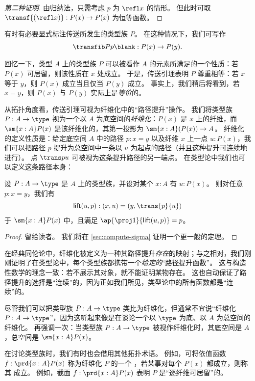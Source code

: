 \begin{proof}[第二种证明]
  由归纳法，只需考虑 $p$ 为 $\refl x$ 的情形。
  但此时可取 $\transf{(\refl x)}:P(x)\to P(x)$ 为恒等函数。
\end{proof}

有时有必要显式标注传送所发生的类型族 $P$。
在这种情况下，我们可写作
\[\transfib P p \blank : P(x) \to P(y).\]

回忆一下，类型 $A$ 上的类型族 $P$ 可以被看作 $A$ 的元素所满足的一个性质：若 $P(x)$ 可居留，则该性质在 $x$ 处成立。
于是，传送引理表明 $P$ 尊重相等：若 $x$ 等于 $y$，则 $P(x)$ 成立当且仅当 $P(y)$ 成立。
事实上，我们稍后将看到，若 $x=y$，则 $P(x)$ 与 $P(y)$ 实际上是\emph{等价}的。

从拓扑角度看，传送引理可视为纤维化中的“路径提升”操作。
%
%
我们将类型族 $P:A\to \type$ 视为一个以 $A$ 为底空间的\emph{纤维化}：$P(x)$ 是 $x$ 上的纤维，而 $\sm{x:A}P(x)$ 是该纤维化的，其第一投影为 $\sm{x:A}(P(x))\to A$。
纤维化的定义性质是：给定底空间 $A$ 中的路径 $p:x=y$ 以及纤维 $x$ 上一点 $u:P(x)$，我们可以把路径 $p$ 提升为总空间中一条以 $u$ 为起点的路径（并且这种提升可连续地进行）。
点 $\trans p u$ 可被视为这条提升路径的另一端点。
在类型论中我们也可以定义这条路径本身：

\begin{lem}[路径提升性质]\label{thm:path-lifting}
  设 $P:A\to\type$ 是 $A$ 上的类型族，并设对某个 $x:A$ 有 $u:P(x)$。
  则对任意 $p:x=y$，我们有
  \begin{equation*}
    \mathsf{lift}(u,p):(x,u)=(y,\trans{p}{u})
  \end{equation*}
  于 $\sm{x:A}P(x)$ 中，且满足 $\ap{\proj1}{\mathsf{lift}(u,p)} = p$。
\end{lem}
\begin{proof}
  留给读者。
  我们将在 \cref{sec:compute-sigma} 证明一个更一般的定理。
\end{proof}

在经典同伦论中，纤维化被定义为一种其路径提升\emph{存在}的映射；与之相对，我们刚刚证明了在类型论中，每个类型族都携带一个\emph{给定的}“路径提升函数”。
这与构造性数学的理念一致：若不展示其对象，就不能证明某物存在。
%
这也自动保证了路径提升的选择是“连续”的，因为正如我们所见，类型论中的所有函数都是“连续”的。

\begin{rmk}
  尽管我们可以把类型族 $P:A\to \type$ 类比为纤维化，但通常不宜说“纤维化 $P:A\to\type$”，因为这听起来像是在谈论一个以 $\type$ 为底、以 $A$ 为总空间的纤维化。
  再强调一次：当类型族 $P:A\to \type$ 被视作纤维化时，其底空间是 $A$，总空间是 $\sm{x:A} P(x)$。

  在讨论类型族时，我们有时也会借用其他拓扑术语。
  例如，可将依值函数 $f:\prd{x:A} P(x)$ 称为纤维化 $P$ 的一个
  ，若某事对每个 $P(x)$ 都成立，则称其
  成立。
  例如，截面 $f:\prd{x:A} P(x)$ 表明 $P$ 是“逐纤维可居留”的。
\end{rmk}

